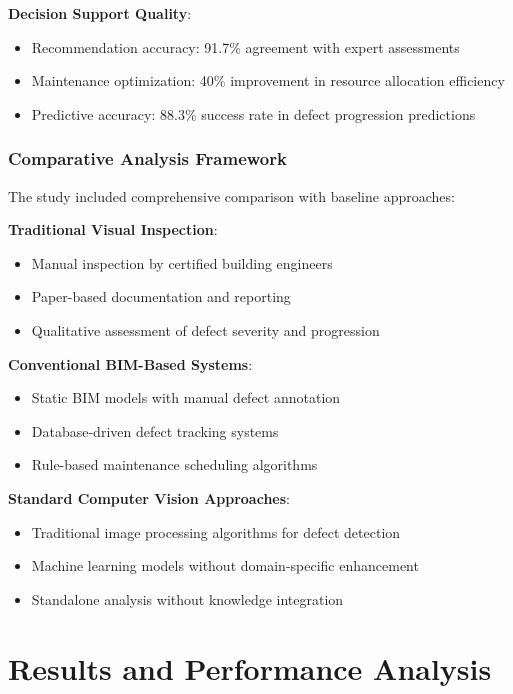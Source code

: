 \textbf{Decision Support Quality}:
\begin{itemize}
    \item Recommendation accuracy: 91.7\% agreement with expert assessments
    \item Maintenance optimization: 40\% improvement in resource allocation efficiency
    \item Predictive accuracy: 88.3\% success rate in defect progression predictions
\end{itemize}

\subsubsection{Comparative Analysis Framework}

The study included comprehensive comparison with baseline approaches:

\textbf{Traditional Visual Inspection}:
\begin{itemize}
    \item Manual inspection by certified building engineers
    \item Paper-based documentation and reporting
    \item Qualitative assessment of defect severity and progression
\end{itemize}

\textbf{Conventional BIM-Based Systems}:
\begin{itemize}
    \item Static BIM models with manual defect annotation
    \item Database-driven defect tracking systems
    \item Rule-based maintenance scheduling algorithms
\end{itemize}

\textbf{Standard Computer Vision Approaches}:
\begin{itemize}
    \item Traditional image processing algorithms for defect detection
    \item Machine learning models without domain-specific enhancement
    \item Standalone analysis without knowledge integration
\end{itemize}

\section{Results and Performance Analysis}

